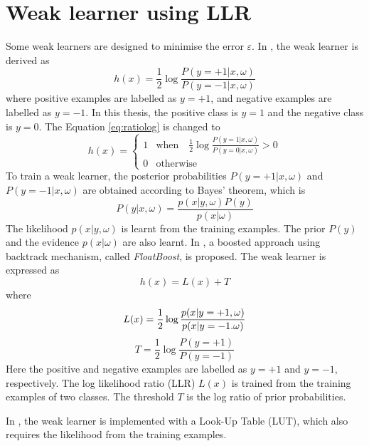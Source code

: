 \chapter{Weak learner using LLR}
\label{apx:LLR}
Some weak learners are designed to minimise the error $\varepsilon$. In \cite{Schapire1998,Friedman2000}, the weak learner is derived as
\begin{equation}
 h(x)=\frac{1}{2}\log \frac{P(y=+1|x,\omega)}{P(y=-1|x,\omega)}
\label{eq:ratiolog}
\end{equation}
where positive examples are labelled as $y=+1$, and negative examples are labelled as $y=-1$. In this thesis, the positive class is $y=1$ and the negative class is $y=0$. The \mbox{Equation} \ref{eq:ratiolog} is changed to
\begin{equation}
h(x)=\left\{
		 \begin{array}{ll}
		  1 & \textrm{when}\quad \frac{1}{2}\log \frac{P(y=1|x,\omega)}{P(y=0|x,\omega)} > 0\\
		  0 & \textrm{otherwise}
		 \end{array}
		\right. 
\end{equation}
To train a weak learner, the posterior probabilities $P(y=+1|x,\omega)$ and $P(y=-1|x,\omega)$ are obtained according to Bayes' theorem, which is
\begin{equation}
 P(y|x,\omega)=\frac{p(x|y,\omega)P(y)}{p(x|\omega)}
\end{equation}
The likelihood $p(x|y,\omega)$ is learnt from the training examples. The prior $P(y)$ and the evidence $p(x|\omega)$ are also learnt.
In \cite{LiStan2004}, a boosted approach using backtrack mechanism, called \textit{FloatBoost}, is proposed. The weak learner is expressed as
\begin{equation}
 h(x)=L(x)+T
\end{equation}
where
\begin{equation}
 L(x)=\frac{1}{2}\log\frac{p(x|y=+1,\omega)}{p(x|y=-1.\omega)}\\
\end{equation}
\begin{equation}
  T=\frac{1}{2}\log\frac{P(y=+1)}{P(y=-1)}
\end{equation}
Here the positive and negative examples are labelled as $y=+1$ and $y=-1$, respectively. The log likelihood ratio (LLR) $L(x)$ is trained from the training examples of two classes. The threshold $T$ is the log ratio of prior probabilities. 

In \cite{Huang2004}, the weak learner is implemented with a Look-Up Table (LUT), which also requires the likelihood from the training examples.

